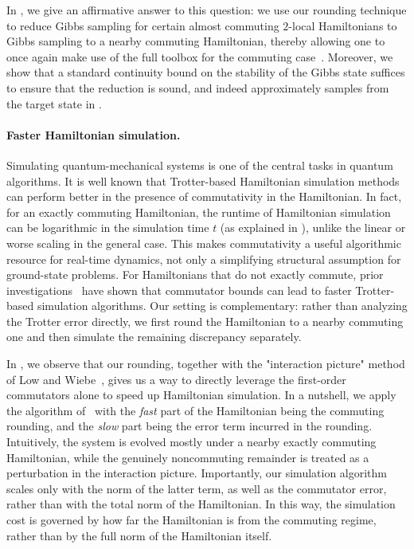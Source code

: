 \documentclass[a4paper,onecolumn,11pt]{quantumarticle}
\theoremstyle{plain}
\begin{document}
In , we give an affirmative answer to this question: we 
use our rounding technique to reduce Gibbs sampling for certain almost 
commuting $2$-local Hamiltonians to Gibbs sampling to a nearby 
commuting Hamiltonian, thereby allowing one to once again make use of 
the full toolbox for the commuting case~\cite{hwang2025gibbsstatepreparationcommuting,schmidhuber2025hamiltoniandecodedquantuminterferometry}.
Moreover, we show that a standard continuity bound on the stability of the Gibbs state suffices to ensure 
that the reduction is sound, and indeed approximately samples from the 
target state in .

\paragraph{Faster Hamiltonian simulation.}
Simulating quantum-mechanical systems is one of the central tasks in quantum algorithms.
It is well known that Trotter-based Hamiltonian simulation methods can perform better in the presence of commutativity in the Hamiltonian. In fact, for an exactly commuting Hamiltonian, the runtime of Hamiltonian simulation can be logarithmic in the simulation time $t$ (as explained in ), unlike the linear or worse scaling in the general case.
This makes commutativity a useful algorithmic resource for real-time dynamics, not only a simplifying structural assumption for ground-state problems.
For Hamiltonians that do not exactly commute, prior investigations~\cite{childs2021theory} have shown that commutator bounds can lead to faster Trotter-based simulation algorithms.  Our setting is complementary: rather than analyzing the Trotter error directly, we first round the Hamiltonian to a nearby commuting one and then simulate the remaining discrepancy separately.

In , we observe that our rounding, together with the "interaction picture" method of Low and Wiebe~\cite{low2018hamiltonian}, gives us a way to directly leverage the first-order commutators alone to speed up Hamiltonian simulation. In a nutshell, we apply the algorithm of~\cite{low2018hamiltonian} with the \emph{fast} part of the Hamiltonian being the commuting rounding, and the \emph{slow} part being the error term incurred in the rounding. 
Intuitively, the system is evolved mostly under a nearby exactly commuting Hamiltonian, while the genuinely noncommuting remainder is treated as a perturbation in the interaction picture.
Importantly, our simulation algorithm scales only with the norm of the latter term, as well as the commutator error,
rather than with the total norm of the Hamiltonian.
In this way, the simulation cost is governed by how far the Hamiltonian is from the commuting regime, rather than by the full norm of the Hamiltonian itself.
\end{document}
